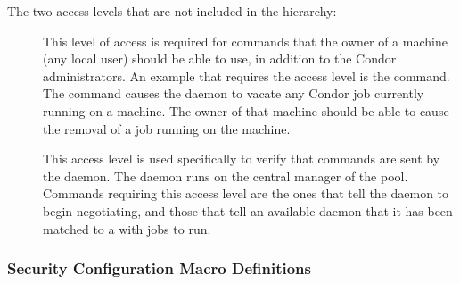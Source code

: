 The two access levels that are not included in the hierarchy:
\begin{description}
\item[] \label{dcperm:owner} This level of access is
   required for commands that the owner of a machine (any local user)
   should be able to use, in addition to the Condor administrators.
   An example that requires the  access level is
   the  command.
   The command causes the  daemon to vacate any
   Condor job currently running on a machine.
   The owner of that machine should be able to cause the removal
   of a job running on the machine.

\item[] \label{dcperm:negotiator} This 
   access level is used specifically to verify that commands are
   sent by the  daemon.
   The  daemon runs on the central manager of
   the pool.
   Commands requiring this access
   level are the ones that tell the  daemon to begin
   negotiating, and those that tell an available  daemon
   that it has been matched to a  with jobs to run.

\end{description}

\subsubsection{\label{sec:Security-macros} Security Configuration Macro Definitions}


